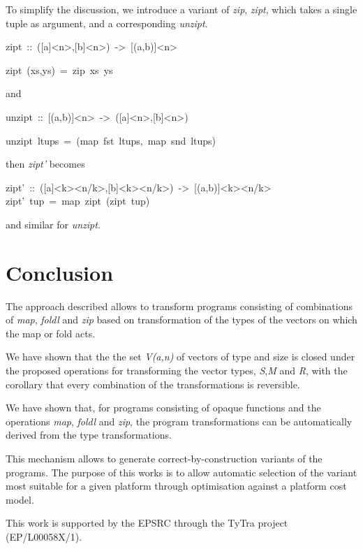 \documentclass{article}
\newenvironment{lyxcode}
{\par\begin{list}{}{
\setlength{\rightmargin}{\leftmargin}
\setlength{\listparindent}{0pt}\raggedright
\setlength{\itemsep}{0pt}
\setlength{\parsep}{0pt}
\normalfont\ttfamily}\item[]}
{\end{list}}
\begin{document}
To simplify the discussion, we introduce a variant of \emph{zip},
\emph{zipt}, which takes a single tuple as argument, and a corresponding
\emph{unzipt}.
\begin{lyxcode}
zipt~::~({[}a{]}<n>,{[}b{]}<n>)~->~{[}(a,b){]}<n>

zipt~(xs,ys)~=~zip~xs~ys
\end{lyxcode}
and
\begin{lyxcode}
unzipt~::~{[}(a,b){]}<n>~->~({[}a{]}<n>,{[}b{]}<n>)

unzipt~ltups~=~(map~fst~ltups,~map~snd~ltups)
\end{lyxcode}
then \emph{zipt'} becomes 
\begin{lyxcode}
zipt'~::~({[}a{]}<k><n/k>,{[}b{]}<k><n/k>)~->~{[}(a,b){]}<k><n/k>
zipt'~tup~=~map~zipt~(zipt~tup)
\end{lyxcode}
and similar for \emph{unzipt}.

\section{Conclusion}

The approach described allows to transform programs consisting of
combinations of \emph{map}, \emph{foldl} and \emph{zip} based on transformation of the types
of the vectors on which the map or fold acts. 

We have shown that the the set \emph{V(a,n)} of vectors of type  and size  is closed under the proposed operations for transforming the vector types, \emph{S},\emph{M} and \emph{R}, with the corollary that every combination of the transformations is reversible.

We have shown that, for programs consisting of opaque functions and the operations \emph{map}, \emph{foldl} and \emph{zip}, the program transformations can be automatically derived from the type transformations.

This mechanism allows to generate correct-by-construction variants of the programs. The purpose of this works is to allow automatic selection of the variant most suitable for a given platform through optimisation against a platform cost model.

This work is supported by the EPSRC through the TyTra project (EP/L00058X/1).



\end{document}
